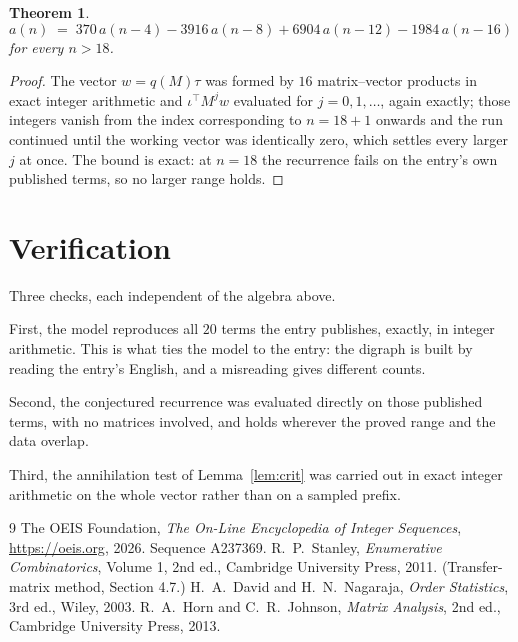 \documentclass[11pt,a4paper]{article}
\theoremstyle{plain}
\newtheorem{theorem}{Theorem}
\theoremstyle{definition}
\begin{document}
\begin{theorem}
\[
a(n)\;=\;370\,a(n-4) - 3916\,a(n-8) + 6904\,a(n-12) - 1984\,a(n-16)
\]
for every $n>18$.
\end{theorem}

\begin{proof}
The vector $w=q(M)\tau$ was formed by $16$ matrix--vector products in exact integer
arithmetic and $\iota^{\!\top}M^{j}w$ evaluated for $j=0,1,\dots$, again exactly; those
integers vanish from the index corresponding to $n=18+1$ onwards and the run continued
until the working vector was identically zero, which settles every larger $j$ at once. The bound is exact: at $n=18$ the recurrence fails on the entry's own published terms, so no larger range holds.
\end{proof}

\section{Verification}

Three checks, each independent of the algebra above.

First, the model reproduces all $20$ terms the entry publishes, exactly, in integer
arithmetic. This is what ties the model to the entry: the digraph is built by reading the
entry's English, and a misreading gives different counts.

Second, the conjectured recurrence was evaluated directly on those published terms, with no
matrices involved, and holds wherever the proved range and the data overlap.

Third, the annihilation test of Lemma~\ref{lem:crit} was carried out in exact integer
arithmetic on the whole vector rather than on a sampled prefix.

\begin{thebibliography}{9}
 The OEIS Foundation, \emph{The On-Line Encyclopedia of Integer
Sequences}, \url{https://oeis.org}, 2026. Sequence A237369.
 R.~P.~Stanley, \emph{Enumerative Combinatorics}, Volume 1, 2nd ed.,
Cambridge University Press, 2011. (Transfer-matrix method, Section 4.7.)
 H.~A.~David and H.~N.~Nagaraja, \emph{Order Statistics}, 3rd ed., Wiley,
2003.
 R.~A.~Horn and C.~R.~Johnson, \emph{Matrix Analysis}, 2nd ed., Cambridge
University Press, 2013.
\end{thebibliography}
\end{document}
